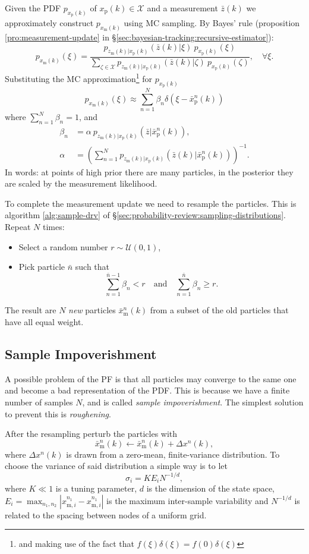 \documentclass[]{hsrzf}
\theoremstyle{plain}
\theoremstyle{definition}
\theoremstyle{remark}
\begin{document}
Given the PDF $p_{x_\mathrm{p}(k)}$ of $x_\mathrm{p}(k) \in \mathcal{X}$ and a
measurement $\bar{z}(k)$ we approximately construct $p_{x_\mathrm{m}(k)}$
using MC sampling. By Bayes' rule (proposition \ref{pro:measurement-update} in
\S\ref{sec:bayesian-tracking:recursive-estimator}):
\[
  p_{x_\mathrm{m}(k)}(\xi) = \frac{
    p_{z_\mathrm{m}(k) | x_\mathrm{p}(k)} (\bar{z}(k) | \xi)
    ~
    p_{x_\mathrm{p}(k)}(\xi)
  }{
    \sum_{\zeta\in\mathcal{X}}
      p_{z_\mathrm{m}(k) | x_\mathrm{p}(k)} (\bar{z}(k) | \zeta)
      ~
      p_{x_\mathrm{p}(k)}(\zeta)
  },
  \quad\forall \xi.
\]
Substituting the MC approximation\footnote{and making use of the fact that
$f(\xi) \delta(\xi) = f(0) \delta(\xi)$} for $p_{x_\mathrm{p}(k)}$
\[
  p_{x_\mathrm{m}(k)}(\xi) \approx
    \sum_{n=1}^N \beta_n \delta(\xi - \bar{x}_\mathrm{p}^n(k))
\]
where $\sum_{n=1}^N \beta_n = 1$, and
\begin{align*}
  \beta_n &= \alpha ~ p_{z_\mathrm{m}(k) | x_\mathrm{p}(k)}
    (\bar{z} | \bar{x}_\mathrm{p}^n(k)), \\
  \alpha &= \left( \sum_{n=1}^N
    p_{z_\mathrm{m}(k) | x_\mathrm{p}(k)}
      (\bar{z}(k) | \bar{x}_\mathrm{p}^n(k))
  \right)^{-1}.
\end{align*}
In words: at points of high prior there are many particles, in the posterior
they are scaled by the measurement likelihood.

To complete the measurement update we need to resample the particles. This is
algorithm \ref{alg:sample-drv} of
\S\ref{sec:probability-review:sampling-distributions}. Repeat $N$ times:
\begin{itemize}
  \item Select a random number $r \sim \mathcal{U}(0,1)$,
  \item Pick particle $\bar{n}$ such that
    \[
      \sum_{n=1}^{\bar{n}-1} \beta_n < r
      \quad\text{and}\quad
      \sum_{n=1}^{\bar{n}} \beta_n \geq r.
    \]
\end{itemize}
The result are $N$ \emph{new} particles $\bar{x}_\mathrm{m}^n(k)$ from a
subset of the old particles that have all equal weight.

\subsection{Sample Impoverishment}

A possible problem of the PF is that all particles may converge to the same
one and become a bad representation of the PDF. This is because we have a
finite number of samples $N$, and is called \emph{sample impoverishment}. The
simplest solution to prevent this is \emph{roughening}.

After the resampling perturb the particles with
\[
  \bar{x}_\mathrm{m}^n(k) \leftarrow \bar{x}_\mathrm{m}^n(k) + \Delta x^n(k),
\]
where $\Delta x^n(k)$ is drawn from a zero-mean, finite-variance distribution.
To choose the variance of said distribution a simple way is to let
\[
  \sigma_i = K E_i N^{-1/d},
\]
where $K \ll 1$ is a tuning parameter, $d$ is the dimension of the state
space, $E_i = \max_{n_1, n_2} | x_{\mathrm{m},i}^{n_1} -
x_{\mathrm{m},i}^{n_1} |$ is the maximum inter-sample variability and
$N^{-1/d}$ is related to the spacing between nodes of a uniform grid.
\end{document}
